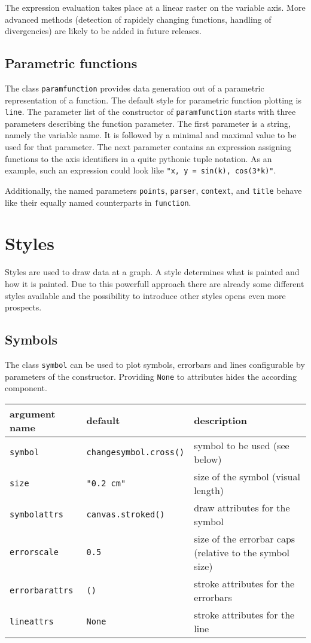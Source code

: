 The expression evaluation takes place at a linear raster on the
variable axis. More advanced methods (detection of rapidely changing
functions, handling of divergencies) are likely to be added in future
releases.

\subsection{Parametric functions}

The class \verb|paramfunction| provides data generation out of a
parametric representation of a function. The default style for
parametric function plotting is \verb|line|. The parameter list of the
constructor of \verb|paramfunction| starts with three parameters
describing the function parameter. The first parameter is a string,
namely the variable name. It is followed by a minimal and maximal
value to be used for that parameter. The next parameter contains an
expression assigning functions to the axis identifiers in a quite
pythonic tuple notation. As an example, such an expression could look
like \verb|"x, y = sin(k), cos(3*k)"|.

Additionally, the named parameters \verb|points|, \verb|parser|,
\verb|context|, and \verb|title| behave like their equally named
counterparts in \verb|function|.

\section{Styles}
\label{graph:styles}

Styles are used to draw data at a graph. A style determines what is
painted and how it is painted. Due to this powerfull approach there
are already some different styles available and the possibility to
introduce other styles opens even more prospects.

\subsection{Symbols}

The class \verb|symbol| can be used to plot symbols, errorbars and lines
configurable by parameters of the constructor. Providing \verb|None|
to attributes hides the according component.

\medskip
\begin{tabularx}{\linewidth}{ll>{\raggedright\arraybackslash}X}
argument name&default&description\\
\hline
\texttt{symbol}&\texttt{changesymbol.cross()}&symbol to be used (see below)\\
\texttt{size}&\texttt{"0.2 cm"}&size of the symbol (visual length)\\
\texttt{symbolattrs}&\texttt{canvas.stroked()}&draw attributes for the symbol\\
\texttt{errorscale}&\texttt{0.5}&size of the errorbar caps (relative to the symbol size)\\
\texttt{errorbarattrs}&\texttt{()}&stroke attributes for the errorbars\\
\texttt{lineattrs}&\texttt{None}&stroke attributes for the line\\
\end{tabularx}
\medskip

